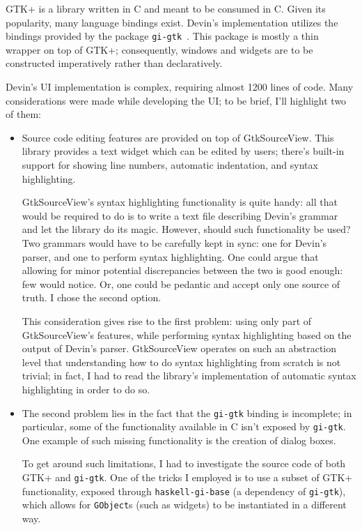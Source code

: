 \documentclass[UdineBachThesis,american,11pt]{PhdThesis}
\begin{document}
  GTK+ is a library written in C and meant to be consumed in C. Given its
  popularity, many language bindings exist. Devin's implementation utilizes the
  bindings provided by the package \mbox{\texttt{gi-gtk}}~\cite{gi-gtk}. This
  package is mostly a thin wrapper on top of GTK+; consequently, windows and
  widgets are to be constructed imperatively rather than declaratively.

  Devin's UI implementation is complex, requiring almost 1200 lines of code.
  Many considerations were made while developing the UI; to be brief, I'll
  highlight two of them:

  \begin{itemize}
    \item Source code editing features are provided on top of GtkSourceView.
    This library provides a text widget which can be edited by users; there's
    built-in support for showing line numbers, automatic indentation, and syntax
    highlighting.

    \pagebreak

    GtkSourceView's syntax highlighting functionality is quite handy: all that
    would be required to do is to write a text file describing Devin's grammar
    and let the library do its magic. However, should such functionality be
    used? Two grammars would have to be carefully kept in sync: one for Devin's
    parser, and one to perform syntax highlighting. One could argue that
    allowing for minor potential discrepancies between the two is good enough:
    few would notice. Or, one could be pedantic and accept only one source of
    truth. I chose the second option.

    This consideration gives rise to the first problem: using only part of
    GtkSourceView's features, while performing syntax highlighting based on the
    output of Devin's parser. GtkSourceView operates on such an abstraction
    level that understanding how to do syntax highlighting from scratch is not
    trivial; in fact, I had to read the library's implementation of automatic
    syntax highlighting in order to do so.

    \item The second problem lies in the fact that the \mbox{\texttt{gi-gtk}}
    binding is incomplete; in particular, some of the functionality available in
    C isn't exposed by \mbox{\texttt{gi-gtk}}. One example of such missing
    functionality is the creation of dialog boxes.

    To get around such limitations, I had to investigate the source code of both
    GTK+ and \mbox{\texttt{gi-gtk}}. One of the tricks I employed is to use a
    subset of GTK+ functionality, exposed through
    \mbox{\texttt{haskell-gi-base}} (a dependency of \mbox{\texttt{gi-gtk}}),
    which allows for \mbox{\texttt{GObject}s} (such as widgets) to be
    instantiated in a different way.
  \end{itemize}
\end{document}
